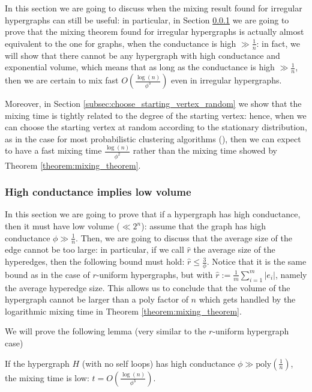\documentclass[../main.tex]{subfiles}
\begin{document}
In this section we are going to discuss when the mixing result found for irregular hypergraphs can still be useful: in particular, in Section \ref{subsec:avg_r_related_to_conductance} we are going to prove that the mixing theorem found for irregular hypergraphs is actually almost equivalent to the one for graphs, when the conductance is high $\gg \frac{1}{n}$: in fact, we will show that there cannot be any hypergraph with high conductance and exponential volume, which means that as long as the conductance is high $\gg \frac{1}{n}$, then we are certain to mix fast $O\left(\frac{\log(n)}{\phi^3}\right)$ even in irregular hypergraphs.

Moreover, in Section \ref{subsec:choose_starting_vertex_random} we show that the mixing time is tightly related to the degree of the starting vertex: hence, when we can choose the starting vertex at random according to the stationary distribution, as in the case for most probabilistic clustering algorithms (\cite{SpielmanClustering}), then we can expect to have a fast mixing time $\frac{\log(n)}{\phi^2}$ rather than the mixing time showed by Theorem \ref{theorem:mixing_theorem}.

\subsubsection{High conductance implies low volume}
\label{subsec:avg_r_related_to_conductance}

In this section we are going to prove that if a hypergraph has high conductance, then it must have low volume ($\ll 2^n$): assume that the graph has high conductance $\phi \gg \frac{1}{n}$. Then, we are going to discuss that the average size of the edge cannot be too large: in particular, if we call $\hat{r}$ the average size of the hyperedges, then the following bound must hold: $\hat{r} \leq \frac{3}{\phi}$. Notice that it is the same bound as in the case of $r$-uniform hypergraphs, but with $\hat{r} := \frac{1}{m}\sum_{i=1}^{m} |e_i|$, namely the average hyperedge size. This allows us to conclude that the volume of the hypergraph cannot be larger than a poly factor of $n$ which gets handled by the logarithmic mixing time in Theorem \ref{theorem:mixing_theorem}.

We will prove the following lemma (very similar to the $r$-uniform hypergraph case)

\begin{lemma}
\label{lemma:convergence_with_avg_r_hypergraph}
    If the hypergraph $H$ (with no self loops) has high conductance $\phi \gg \text{poly}\left(\frac{1}{n}\right)$, the mixing time is low: $t = O\left(\frac{\log(n)}{\phi^3}\right)$.
\end{lemma}
\end{document}
